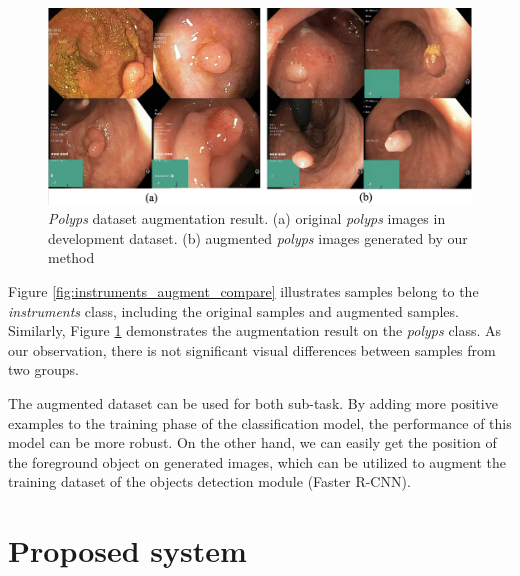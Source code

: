 \begin{figure}[thb]
\begin{center}
\includegraphics[width=\textwidth]{endoscopy_resources/polyp_augment_compare.png}
\end{center}
   \caption{\textit{Polyps} dataset augmentation result. (a) original \textit{polyps} images in development dataset. (b) augmented \textit{polyps} images generated by our method}
\label{fig:polyps_augment_compare}
\end{figure}

Figure \ref{fig:instruments_augment_compare} illustrates samples belong to the \textit{instruments} class, including  the  original samples and augmented samples. Similarly, Figure \ref{fig:polyps_augment_compare} demonstrates the augmentation result on the \textit{polyps} class. As our observation, there is not significant visual differences between samples from two groups. 

The augmented dataset can be used for both sub-task. By adding more positive examples to the training phase of the classification model, the performance of this model can be more robust. On the other hand, we  can easily get the position of the foreground object on generated images, which can be utilized to augment the training dataset of the objects detection module (Faster R-CNN). 

\section{Proposed system}
